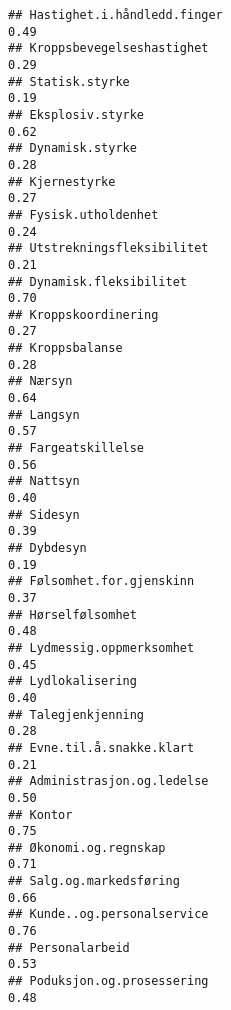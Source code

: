 \documentclass[
]{article}
\begin{document}
\begin{verbatim}
## Hastighet.i.håndledd.finger                                                      0.49
## Kroppsbevegelseshastighet                                                        0.29
## Statisk.styrke                                                                   0.19
## Eksplosiv.styrke                                                                 0.62
## Dynamisk.styrke                                                                  0.28
## Kjernestyrke                                                                     0.27
## Fysisk.utholdenhet                                                               0.24
## Utstrekningsfleksibilitet                                                        0.21
## Dynamisk.fleksibilitet                                                           0.70
## Kroppskoordinering                                                               0.27
## Kroppsbalanse                                                                    0.28
## Nærsyn                                                                           0.64
## Langsyn                                                                          0.57
## Fargeatskillelse                                                                 0.56
## Nattsyn                                                                          0.40
## Sidesyn                                                                          0.39
## Dybdesyn                                                                         0.19
## Følsomhet.for.gjenskinn                                                          0.37
## Hørselfølsomhet                                                                  0.48
## Lydmessig.oppmerksomhet                                                          0.45
## Lydlokalisering                                                                  0.40
## Talegjenkjenning                                                                 0.28
## Evne.til.å.snakke.klart                                                          0.21
## Administrasjon.og.ledelse                                                        0.50
## Kontor                                                                           0.75
## Økonomi.og.regnskap                                                              0.71
## Salg.og.markedsføring                                                            0.66
## Kunde..og.personalservice                                                        0.76
## Personalarbeid                                                                   0.53
## Poduksjon.og.prosessering                                                        0.48

\end{verbatim}
\end{document}
